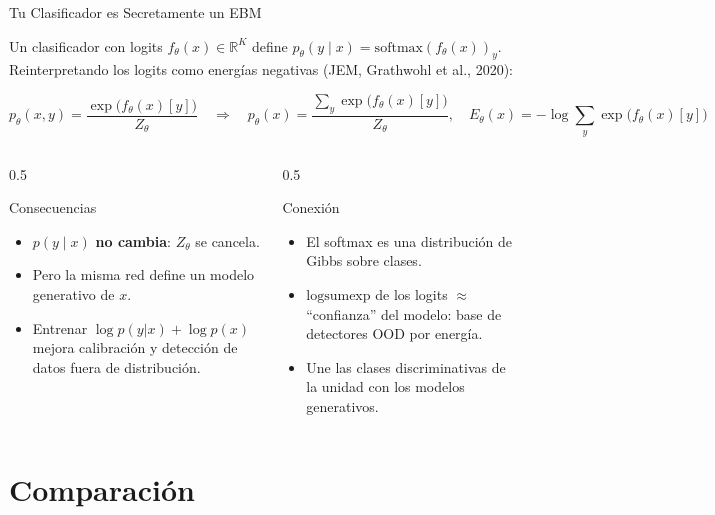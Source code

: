 \documentclass[aspectratio=169, 10pt]{beamer}
\providecommand{\R}{\mathbb{R}}
\newcommand{\formula}[1]{%
	\begin{tcolorbox}[colback=UCMBlue!8, colframe=UCMBlue, arc=4pt,
		boxsep=2pt, left=6pt, right=6pt, top=3pt, bottom=3pt]
		#1
	\end{tcolorbox}
}
\begin{document}
\begin{frame}[shrink]{Tu Clasificador es Secretamente un EBM}

	Un clasificador con logits $f_\theta(x) \in \R^K$ define $p_\theta(y\mid x) = \mathrm{softmax}(f_\theta(x))_y$. Reinterpretando los logits como energ\'ias negativas (JEM, Grathwohl et al., 2020):

	\formula{
		\[
		p_\theta(x, y) = \frac{\exp\big(f_\theta(x)[y]\big)}{Z_\theta}
		\quad\Rightarrow\quad
		p_\theta(x) = \frac{\sum_y \exp\big(f_\theta(x)[y]\big)}{Z_\theta},
		\quad E_\theta(x) = -\log\sum_{y}\exp\big(f_\theta(x)[y]\big)
		\]
	}

	\begin{columns}[T]
		\begin{column}{0.5\textwidth}
			\begin{block}{Consecuencias}
				\small
				\begin{itemize}
					\item $p(y\mid x)$ \textbf{no cambia}: $Z_\theta$ se cancela.
					\item Pero la misma red define un modelo generativo de $x$.
					\item Entrenar $\log p(y|x) + \log p(x)$ mejora calibraci\'on y detecci\'on de datos fuera de distribuci\'on.
				\end{itemize}
			\end{block}
		\end{column}

		\begin{column}{0.5\textwidth}
			\begin{block}{Conexi\'on}
				\small
				\begin{itemize}
					\item El softmax es una distribuci\'on de Gibbs sobre clases.
					\item $\mathrm{logsumexp}$ de los logits $\approx$ ``confianza'' del modelo: base de detectores OOD por energ\'ia.
					\item Une las clases discriminativas de la unidad con los modelos generativos.
				\end{itemize}
			\end{block}
		\end{column}
	\end{columns}

\end{frame}

\section{Comparaci\'on}
\end{document}
